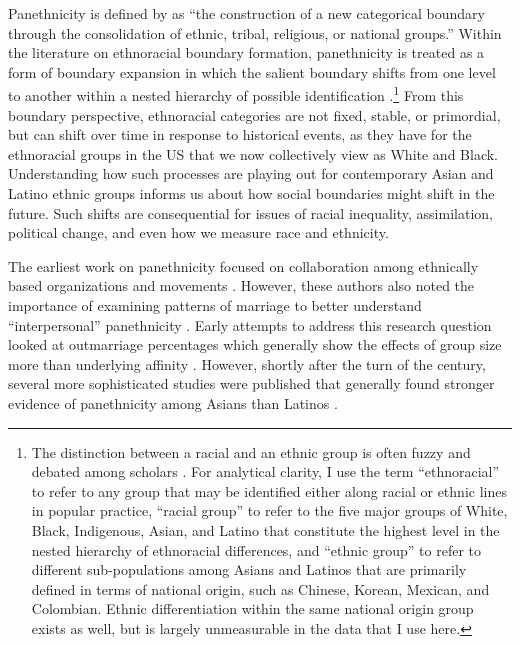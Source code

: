 \documentclass[11pt,]{article}
\begin{document}
Panethnicity is defined by \citet{okamoto_panethnicity_2014a} as ``the construction of a new categorical boundary through the consolidation of ethnic, tribal, religious, or national groups.'' Within the literature on ethnoracial boundary formation, panethnicity is treated as a form of boundary expansion in which the salient boundary shifts from one level to another within a nested hierarchy of possible identification \citep{wimmer_making_2008}.\footnote{The distinction between a racial and an ethnic group is often fuzzy and debated among scholars \citep{brubaker_ethnicity_2009, valdez_racial_2017, lewis_race_2017}. For analytical clarity, I use the term ``ethnoracial'' to refer to any group that may be identified either along racial or ethnic lines in popular practice, ``racial group'' to refer to the five major groups of White, Black, Indigenous, Asian, and Latino that constitute the highest level in the nested hierarchy of ethnoracial differences, and ``ethnic group'' to refer to different sub-populations among Asians and Latinos that are primarily defined in terms of national origin, such as Chinese, Korean, Mexican, and Colombian. Ethnic differentiation within the same national origin group exists as well, but is largely unmeasurable in the data that I use here.} From this boundary perspective, ethnoracial categories are not fixed, stable, or primordial, but can shift over time in response to historical events, as they have for the ethnoracial groups in the US that we now collectively view as White and Black. Understanding how such processes are playing out for contemporary Asian and Latino ethnic groups informs us about how social boundaries might shift in the future. Such shifts are consequential for issues of racial inequality, assimilation, political change, and even how we measure race and ethnicity.

The earliest work on panethnicity focused on collaboration among ethnically based organizations and movements \citep{lopez_panethnicity_1990, okamoto_theory_2003}. However, these authors also noted the importance of examining patterns of marriage to better understand ``interpersonal'' panethnicity \citep[pp.~167-168]{espiritu_asian_1993}. Early attempts to address this research question looked at outmarriage percentages which generally show the effects of group size more than underlying affinity \citep{shinagawa_asian_1996}. However, shortly after the turn of the century, several more sophisticated studies were published that generally found stronger evidence of panethnicity among Asians than Latinos \citep{qian_asian_2001, rosenfeld_salience_2001, qian_latinos_2004, fu_how_2007a, qian_crossing_2012}.
\end{document}
